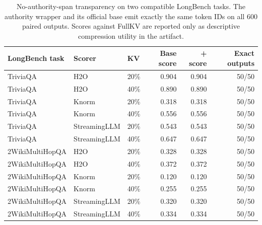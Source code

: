 \begin{table}[t]
\centering
\small
\setlength{\tabcolsep}{3.6pt}
\begin{tabular}{lllrrr}
\toprule
LongBench task & Scorer & KV & Base score & +\method{} score & Exact outputs \\
\midrule
TriviaQA & H2O & 20\% & 0.904 & 0.904 & 50/50 \\
TriviaQA & H2O & 40\% & 0.890 & 0.890 & 50/50 \\
TriviaQA & Knorm & 20\% & 0.318 & 0.318 & 50/50 \\
TriviaQA & Knorm & 40\% & 0.556 & 0.556 & 50/50 \\
TriviaQA & StreamingLLM & 20\% & 0.543 & 0.543 & 50/50 \\
TriviaQA & StreamingLLM & 40\% & 0.647 & 0.647 & 50/50 \\
\midrule
2WikiMultiHopQA & H2O & 20\% & 0.328 & 0.328 & 50/50 \\
2WikiMultiHopQA & H2O & 40\% & 0.372 & 0.372 & 50/50 \\
2WikiMultiHopQA & Knorm & 20\% & 0.120 & 0.120 & 50/50 \\
2WikiMultiHopQA & Knorm & 40\% & 0.255 & 0.255 & 50/50 \\
2WikiMultiHopQA & StreamingLLM & 20\% & 0.320 & 0.320 & 50/50 \\
2WikiMultiHopQA & StreamingLLM & 40\% & 0.334 & 0.334 & 50/50 \\
\bottomrule
\end{tabular}
\caption{No-authority-span transparency on two compatible LongBench tasks. The authority wrapper and its official base emit exactly the same token IDs on all 600 paired outputs. Scores against FullKV are reported only as descriptive compression utility in the artifact.}
\label{tab:utility-equivalence}
\end{table}
